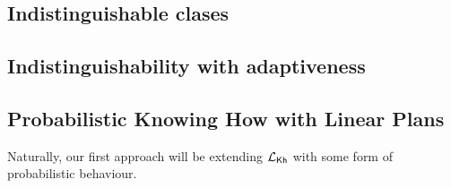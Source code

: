 \subsection{Indistinguishable clases}



\subsection{Indistinguishability with adaptiveness}










\subsection{Probabilistic Knowing How with Linear Plans}
Naturally, our first approach will be extending $\mathcal{L}_{{\mathsf{Kh}}}$ with some form of probabilistic behaviour. 






